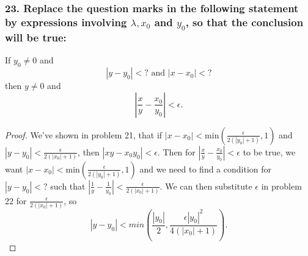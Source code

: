 \documentclass{article}
\begin{document}
\subsubsection*{23. Replace the question marks in the following statement by expressions involving $\lambda, x_0$ and $y_0$, so that the conclusion will be true:}
If $y_0 \ne 0$ and \[ \left|y - y_0\right| < ? \text{ and } \left|x - x_0\right|< ? \] then $y \ne 0$ and \[ \left|\frac{x}{y} - \frac{x_0}{y_0}\right| < \epsilon. \]
\begin{proof}
	We've shown in problem 21, that if $|x - x_0| < \text{min}(\frac{\epsilon}{2(|y_0| + 1)}, 1)$ and $|y - y_0| < \frac{\epsilon}{2(|x_0| + 1)}$, then $|xy - x_0y_0| < \epsilon$. Then for $\left|\frac{x}{y} - \frac{x_0}{y_0}\right| < \epsilon$ to be true, we want $|x - x_0| < \text{min}(\frac{\epsilon}{2(|y_0| + 1)}, 1)$ and we need to find a condition for $|y - y_0| < ?$ such that $|\frac{1}{y} - \frac{1}{y_0}| < \frac{\epsilon}{2(|x_0| + 1)}$. We can then substitute $\epsilon$ in problem 22 for $\frac{\epsilon}{2(|x_0| + 1)}$, so \[ |y - y_0| < min(\frac{|y_0|}{2}, \frac{\epsilon|y_0|^2}{4(|x_0| + 1)}). \]
\end{proof}
\end{document}
